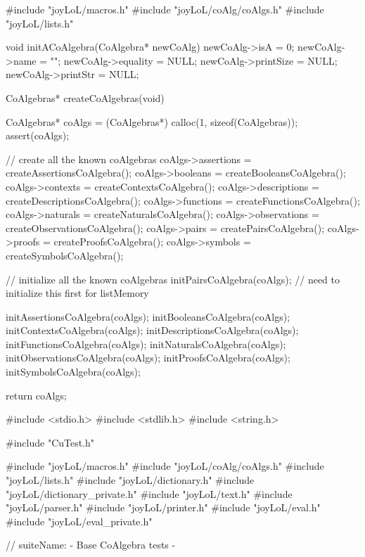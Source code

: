 #include "joyLoL/macros.h"
#include "joyLoL/coAlg/coAlgs.h"
#include "joyLoL/lists.h"

void initACoAlgebra(CoAlgebra* newCoAlg) {
  newCoAlg->isA       = 0;
  newCoAlg->name      = "";
  newCoAlg->equality  = NULL;
  newCoAlg->printSize = NULL;
  newCoAlg->printStr  = NULL;
}

CoAlgebras* createCoAlgebras(void) {
  CoAlgebras* coAlgs = (CoAlgebras*) calloc(1, sizeof(CoAlgebras));
  assert(coAlgs);


  // create all the known coAlgebras
  coAlgs->assertions    = createAssertionsCoAlgebra();
  coAlgs->booleans      = createBooleansCoAlgebra();
  coAlgs->contexts      = createContextsCoAlgebra();
  coAlgs->descriptions  = createDescriptionsCoAlgebra();
  coAlgs->functions     = createFunctionsCoAlgebra();
  coAlgs->naturals      = createNaturalsCoAlgebra();
  coAlgs->observations  = createObservationsCoAlgebra();
  coAlgs->pairs         = createPairsCoAlgebra();
  coAlgs->proofs        = createProofsCoAlgebra();
  coAlgs->symbols       = createSymbolsCoAlgebra();

  // initialize all the known coAlgebras
  initPairsCoAlgebra(coAlgs); // need to initialize this first for listMemory

  initAssertionsCoAlgebra(coAlgs);
  initBooleansCoAlgebra(coAlgs);
  initContextsCoAlgebra(coAlgs);
  initDescriptionsCoAlgebra(coAlgs);
  initFunctionsCoAlgebra(coAlgs);
  initNaturalsCoAlgebra(coAlgs);
  initObservationsCoAlgebra(coAlgs);
  initProofsCoAlgebra(coAlgs);
  initSymbolsCoAlgebra(coAlgs);

  return coAlgs;
}
\stopCCode


\starttyping
#include <stdio.h>
#include <stdlib.h>
#include <string.h>

#include "CuTest.h"

#include "joyLoL/macros.h"
#include "joyLoL/coAlg/coAlgs.h"
#include "joyLoL/lists.h"
#include "joyLoL/dictionary.h"
#include "joyLoL/dictionary_private.h"
#include "joyLoL/text.h"
#include "joyLoL/parser.h"
#include "joyLoL/printer.h"
#include "joyLoL/eval.h"
#include "joyLoL/eval_private.h"

// suiteName: - Base CoAlgebra tests -

